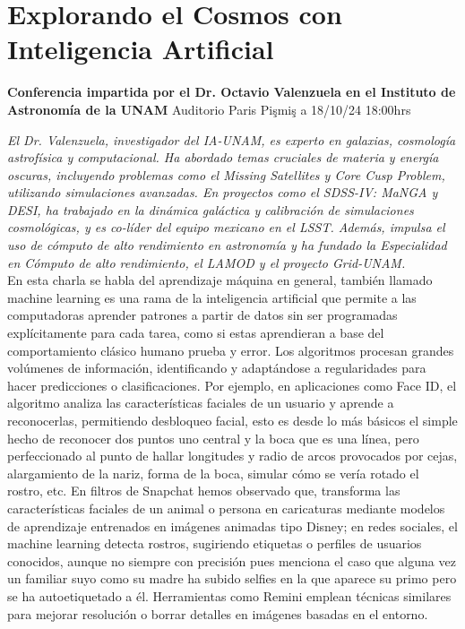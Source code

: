 \documentclass{article}
\begin{document}
\section*{Explorando el Cosmos con Inteligencia Artificial}
\textbf{Conferencia impartida por el Dr. Octavio Valenzuela en el Instituto de Astronomía de la UNAM}
Auditorio Paris Pişmiş a 18/10/24 18:00hrs

\textit{El Dr. Valenzuela, investigador del IA-UNAM, es experto en galaxias, cosmología astrofísica y computacional. Ha abordado temas cruciales de materia y energía oscuras, incluyendo problemas como el Missing Satellites y Core Cusp Problem, utilizando simulaciones avanzadas. En proyectos como el SDSS-IV: MaNGA y DESI, ha trabajado en la dinámica galáctica y calibración de simulaciones cosmológicas, y es co-líder del equipo mexicano en el LSST. Además, impulsa el uso de cómputo de alto rendimiento en astronomía y ha fundado la Especialidad en Cómputo de alto rendimiento, el LAMOD y el proyecto Grid-UNAM.}\\

En esta charla se habla del aprendizaje máquina en general, también llamado machine learning es una rama de la inteligencia artificial que permite a las computadoras aprender patrones a partir de datos sin ser programadas explícitamente para cada tarea, como si estas aprendieran a base del comportamiento clásico humano prueba y error. Los algoritmos procesan grandes volúmenes de información, identificando y adaptándose a regularidades para hacer predicciones o clasificaciones. Por ejemplo, en aplicaciones como Face ID, el algoritmo analiza las características faciales de un usuario y aprende a reconocerlas, permitiendo desbloqueo facial, esto es desde lo más básicos el simple hecho de reconocer dos puntos uno central y la boca que es una línea, pero perfeccionado al punto de hallar longitudes y radio de arcos provocados por cejas, alargamiento de la nariz, forma de la boca, simular cómo se vería rotado el rostro, etc. En filtros de Snapchat hemos observado que, transforma las características faciales de un animal o persona en caricaturas mediante modelos de aprendizaje entrenados en imágenes animadas tipo Disney; en redes sociales, el machine learning detecta rostros, sugiriendo etiquetas o perfiles de usuarios conocidos, aunque no siempre con precisión pues menciona el caso que alguna vez un familiar suyo como su madre ha subido selfies en la que aparece su primo pero se ha autoetiquetado a él. Herramientas como Remini emplean técnicas similares para mejorar resolución o borrar detalles en imágenes basadas en el entorno. \\
\end{document}
